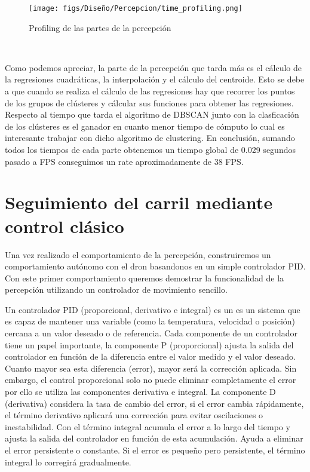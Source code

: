   \begin{figure} [H]
    \begin{center}
      \texttt{[image: figs/Diseño/Percepcion/time\_profiling.png]}
    \end{center}
    \caption{Profiling de las partes de la percepción}
    \label{fig:centro de masas}
  \end{figure}\

  Como podemos apreciar, la parte de la percepción que tarda más es el cálculo de la regresiones cuadráticas, la interpolación y el cálculo del centroide. Esto se debe a que
  cuando se realiza el cálculo de las regresiones hay que recorrer los puntos de los grupos de clústeres y cálcular sus funciones para obtener las regresiones. Respecto al 
  tiempo que tarda el algoritmo de DBSCAN junto con la clasficación de los clústeres es el ganador en cuanto menor tiempo de cómputo lo cual es interesante trabajar 
  con dicho algoritmo de clustering. En conclusión, sumando todos los tiempos de cada parte obtenemos un tiempo global de 0.029 segundos pasado a FPS conseguimos un rate aproximadamente
  de 38 FPS. 

  \section{Seguimiento del carril mediante control clásico}
  \label{sec:Control}

  Una vez realizado el comportamiento de la percepción, construiremos un comportamiento autónomo con el dron basandonos en un simple controlador PID. 
 Con este primer comportamiento queremos demostrar la funcionalidad de la percepción utilizando un controlador de movimiento sencillo. \newline

 Un controlador PID (proporcional, derivativo e integral) es un 
  es un sistema que es capaz de mantener una variable (como la temperatura, velocidad o posición) cercana a un valor deseado o de referencia. Cada componente de un controlador tiene un papel 
  importante,
  la componente P (proporcional) ajusta la salida del controlador en función de la diferencia entre el valor medido y el valor deseado. 
  Cuanto mayor sea esta diferencia (error), mayor será la corrección aplicada. Sin embargo, el control proporcional solo no puede eliminar completamente el error por ello se utiliza
  las componentes derivativa e integral. La componente D (derivativa) considera la tasa de cambio del error,
  si el error cambia rápidamente, el término derivativo aplicará una corrección para evitar oscilaciones o inestabilidad.
  Con el término integral acumula el error a lo largo del tiempo y ajusta la salida del controlador en función de esta acumulación. 
  Ayuda a eliminar el error persistente o constante. Si el error es pequeño pero persistente, el término integral lo corregirá gradualmente.
  \newline

